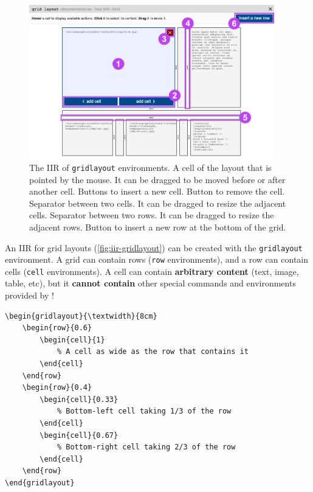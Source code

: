 \documentclass[11pt, a4paper]{article}
\begin{document}


\begin{figure}[h!]
    \centering
    \includegraphics[width = 0.95\textwidth]{img/iir-gridlayout.png}
    \caption{The IIR of \texttt{gridlayout} environments.  A cell of the layout that is pointed by the mouse. It can be dragged to be moved before or after another cell.  Buttons to insert a new cell.  Button to remove the cell.  Separator between two cells. It can be dragged to resize the adjacent cells.  Separator between two rows. It can be dragged to resize the adjacent rows.  Button to insert a new row at the bottom of the grid.}
    \label{fig:iir-gridlayout}
\end{figure}

An IIR for grid layouts (\autoref{fig:iir-gridlayout}) can be created with the \texttt{gridlayout} environment.
A grid can contain rows (\texttt{row} environments), and a row can contain cells (\texttt{cell} environments).
A cell can contain \textbf{arbitrary content} (text, image, table, etc), but it \textbf{cannot contain} other special commands and environments provided by \iLaTeX{}!

\begin{lstlisting}[style=custom-latex]
% this grid is as wide as the text (\textwidth) and 8cm tall
\begin{gridlayout}{\textwidth}{8cm}
    \begin{row}{0.6}
        \begin{cell}{1}
            % A cell as wide as the row that contains it
        \end{cell}
    \end{row}
    \begin{row}{0.4}
        \begin{cell}{0.33}
            % Bottom-left cell taking 1/3 of the row
        \end{cell}
        \begin{cell}{0.67}
            % Bottom-right cell taking 2/3 of the row
        \end{cell}
    \end{row}
\end{gridlayout}
\end{lstlisting}
\end{document}
